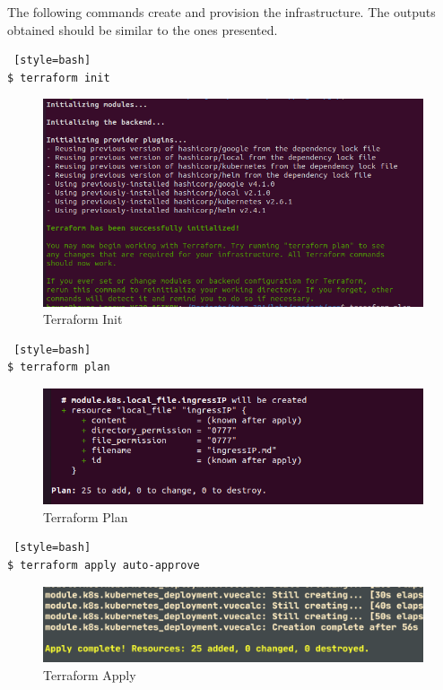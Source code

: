 \documentclass[12pt,a4paper,oneside]{report}
\begin{document}
The following commands create and provision the infrastructure. The outputs obtained should be similar to the ones presented.

\begin{lstlisting} [style=bash]
$ terraform init
\end{lstlisting}

\begin{figure}[H]
\centering
\includegraphics[width=1\textwidth]{./pictures/init.png}
\caption{Terraform Init}
\label{fig:Terraform Init}
\end{figure}

\begin{lstlisting} [style=bash]
$ terraform plan
\end{lstlisting}

\begin{figure}[H]
\centering
\includegraphics[width=1.0\textwidth]{./pictures/plan.png}
\caption{Terraform Plan}
\label{fig:Terraform Plan}
\end{figure}


\begin{lstlisting} [style=bash]
$ terraform apply auto-approve
\end{lstlisting}

\begin{figure}[H]
\centering
\includegraphics[width=1.0\textwidth]{./pictures/apply.png}
\caption{Terraform Apply}
\label{fig:Terraform Apply}
\end{figure}
\end{document}
